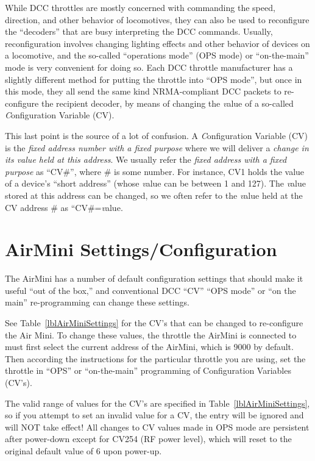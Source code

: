 \documentclass[12pt]{article}
\begin{document}
While DCC throttles are mostly concerned with commanding the speed, direction, and other behavior of locomotives, they can also be used to reconfigure the ``decoders'' that are busy interpreting the DCC commands. 
Usually, reconfiguration involves changing lighting effects and other behavior of devices on a locomotive, and the so-called ``operations mode'' (OPS mode) or ``on-the-main'' mode is very convenient for doing so. 
Each DCC throttle manufacturer has a slightly different method for putting the throttle into ``OPS mode'', but once in this mode, they all send the same kind NRMA-compliant DCC packets to re-configure the recipient decoder, by means of changing the {\textit value} of a so-called {\textit Configuration Variable} (CV).

This last point is the source of a lot of confusion. 
A {\textit Configuration Variable} (CV) is the {\em fixed address number with a fixed purpose} where we will deliver a {\em change in its value held at this address}. 
We usually refer the {\em fixed address with a fixed purpose} as ``CV\#'', where \# is some number. 
For instance, CV1 holds the value of a device's ``short address'' (whose {\textit value} can be between 1 and 127).
The {\textit value} stored at this address can be changed, so we often refer to the {\textit value} held at the CV address \# as ``CV\#={\textit value}.


\section{AirMini Settings/Configuration}
The AirMini has a number of default configuration settings that should make it useful ``out of the box,'' and conventional DCC ``CV'' ``OPS mode'' or ``on the main'' re-programming can change these settings.

See Table~\ref{lblAirMiniSettings} for the CV's that can be changed to re-configure the Air Mini.
To change these values, the throttle the AirMini is connected to must first select the current address of the AirMini, which is 9000 by default. 
Then according the instructions for the particular throttle you are using, set the throttle in ``OPS'' or ``on-the-main'' programming of Configuration Variables (CV's).

The valid range of values for the CV's are specified in Table~\ref{lblAirMiniSettings}, so if you attempt to set an invalid value for a CV, the entry will be ignored and will NOT take effect!
All changes to CV values made in OPS mode are persistent after power-down except for CV254 (RF power level), which will reset to the original default value of 6 upon power-up.
\end{document}
